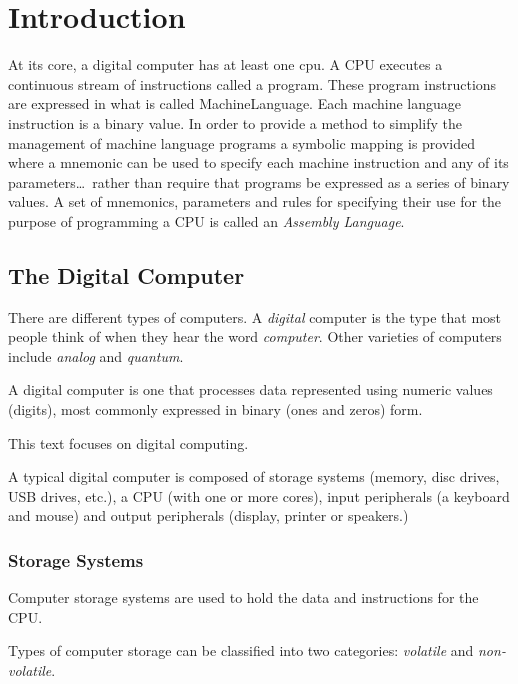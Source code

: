 \chapter{Introduction}
\label{chapter:Introduction}

At its core, a digital computer has at least one \acrfull{cpu}.  A
CPU executes a continuous stream of instructions called a \gls{program}.  
These program instructions are expressed in what is called 
\gls{MachineLanguage}.  Each machine language instruction is a \gls{binary} value.  
In order to provide a method to simplify the management of machine language 
programs a symbolic mapping is provided where a \gls{mnemonic} can be used to 
specify each machine instruction and any of its parameters\ldots\ rather 
than require that programs be expressed as a series of binary values.  
A set of mnemonics, parameters and rules for specifying their use for
the purpose of programming a CPU is called an {\em Assembly Language}.

\section{The Digital Computer}

There are different types of computers.  A {\em digital} computer is
the type that most people think of when they hear the word {\em computer}.
Other varieties of computers include {\em analog} and {\em quantum}.

A digital computer is one that processes data represented
using numeric values (digits), most commonly expressed in binary
(ones and zeros) form.

This text focuses on digital computing.

A typical digital computer is composed of storage systems (memory, disc 
drives, USB drives, etc.), a CPU (with one or more cores), input peripherals 
(a keyboard and mouse) and output peripherals (display, printer or speakers.)

\subsection{Storage Systems}

Computer storage systems are used to hold the data and instructions
for the CPU.

Types of computer storage can be classified into two categories:
{\em volatile} and {\em non-volatile}.


